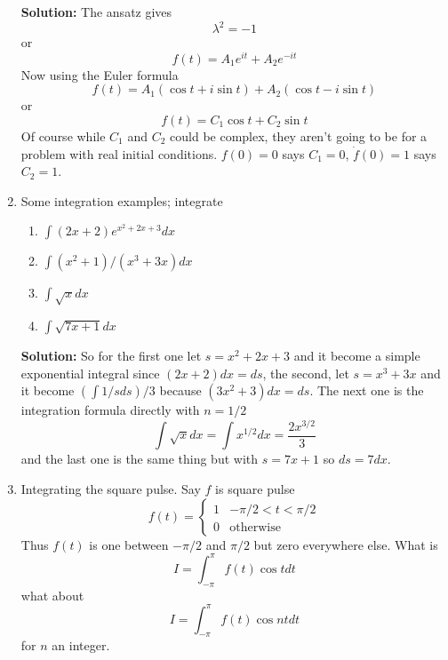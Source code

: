 \documentclass[12pt]{article}
\begin{document}
\begin{enumerate}
\textbf{Solution: } The ansatz gives
\begin{equation}
\lambda^2=-1
\end{equation}
or 
\begin{equation}
f(t)=A_1e^{it}+A_2e^{-it}
\end{equation}
Now using the Euler formula
\begin{equation}
f(t)=A_1(\cos{t}+i\sin{t})+A_2(\cos{t}-i\sin{t})
\end{equation}
or
\begin{equation}
f(t)=C_1\cos{t}+C_2\sin{t}
\end{equation}
Of course while $C_1$ and $C_2$ could be complex, they aren't going to
be for a problem with real initial conditions. $f(0)=0$ says $C_1=0$,
$\dot{f}(0)=1$ says $C_2=1$.

\item Some integration examples; integrate
\begin{enumerate}
\item $\int (2x+2)e^{x^2+2x+3}dx$
\item $\int (x^2+1)/(x^3+3x)dx$
\item $\int \sqrt{x}dx$
\item $\int \sqrt{7x+1}dx$
\end{enumerate}

\textbf{Solution: } So for the first one let $s=x^2+2x+3$ and it
become a simple exponential integral since $(2x+2)dx=ds$, the second,
let $s=x^3+3x$ and it become $(\int 1/s ds)/3$ because
$(3x^2+3)dx=ds$. The next one is the integration formula directly with $n=1/2$
\begin{equation}
\int \sqrt{x}dx=\int x^{1/2}dx=\frac{2x^{3/2}}{3}
\end{equation}
and the last one is the same thing but with $s=7x+1$ so $ds=7dx$.

\item Integrating the square pulse. Say $f$ is square pulse
\begin{equation}
f(t)=\left\{\begin{array}{ll}1&-\pi/2<t<\pi/2\\0&\mbox{otherwise}\end{array}\right.
\end{equation}
Thus $f(t)$ is one between $-\pi/2$ and $\pi/2$ but zero everywhere else. What is
\begin{equation}
I=\int_{-\pi}^\pi f(t)\cos{t}dt
\end{equation}
what about
\begin{equation}
I=\int_{-\pi}^\pi f(t)\cos{nt}dt
\end{equation}
for $n$ an integer.
\end{enumerate}
\end{document}
